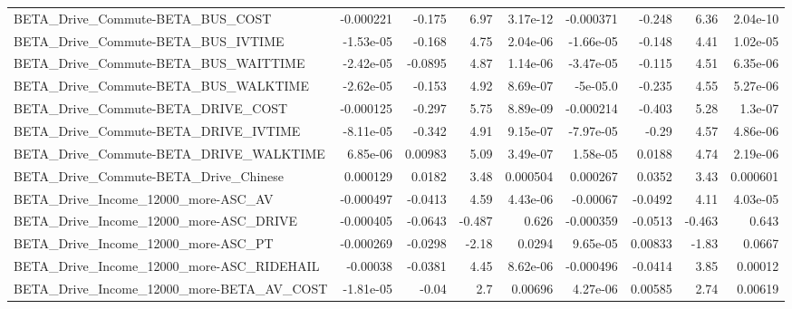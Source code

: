 \begin{tabular}{lrrrrrrrr}
BETA\_Drive\_Commute-BETA\_BUS\_COST                   &   -0.000221 &       -0.175 &     6.97 & 3.17e-12 &  -0.000371 &      -0.248 &         6.36 &      2.04e-10 \\
BETA\_Drive\_Commute-BETA\_BUS\_IVTIME                 &   -1.53e-05 &       -0.168 &     4.75 & 2.04e-06 &  -1.66e-05 &      -0.148 &         4.41 &      1.02e-05 \\
BETA\_Drive\_Commute-BETA\_BUS\_WAITTIME               &   -2.42e-05 &      -0.0895 &     4.87 & 1.14e-06 &  -3.47e-05 &      -0.115 &         4.51 &      6.35e-06 \\
BETA\_Drive\_Commute-BETA\_BUS\_WALKTIME               &   -2.62e-05 &       -0.153 &     4.92 & 8.69e-07 &   -5e-05.0 &      -0.235 &         4.55 &      5.27e-06 \\
BETA\_Drive\_Commute-BETA\_DRIVE\_COST                 &   -0.000125 &       -0.297 &     5.75 & 8.89e-09 &  -0.000214 &      -0.403 &         5.28 &       1.3e-07 \\
BETA\_Drive\_Commute-BETA\_DRIVE\_IVTIME               &   -8.11e-05 &       -0.342 &     4.91 & 9.15e-07 &  -7.97e-05 &       -0.29 &         4.57 &      4.86e-06 \\
BETA\_Drive\_Commute-BETA\_DRIVE\_WALKTIME             &    6.85e-06 &      0.00983 &     5.09 & 3.49e-07 &   1.58e-05 &      0.0188 &         4.74 &      2.19e-06 \\
BETA\_Drive\_Commute-BETA\_Drive\_Chinese              &    0.000129 &       0.0182 &     3.48 & 0.000504 &   0.000267 &      0.0352 &         3.43 &      0.000601 \\
BETA\_Drive\_Income\_12000\_more-ASC\_AV                &   -0.000497 &      -0.0413 &     4.59 & 4.43e-06 &   -0.00067 &     -0.0492 &         4.11 &      4.03e-05 \\
BETA\_Drive\_Income\_12000\_more-ASC\_DRIVE             &   -0.000405 &      -0.0643 &   -0.487 &    0.626 &  -0.000359 &     -0.0513 &       -0.463 &         0.643 \\
BETA\_Drive\_Income\_12000\_more-ASC\_PT                &   -0.000269 &      -0.0298 &    -2.18 &   0.0294 &   9.65e-05 &     0.00833 &        -1.83 &        0.0667 \\
BETA\_Drive\_Income\_12000\_more-ASC\_RIDEHAIL          &    -0.00038 &      -0.0381 &     4.45 & 8.62e-06 &  -0.000496 &     -0.0414 &         3.85 &       0.00012 \\
BETA\_Drive\_Income\_12000\_more-BETA\_AV\_COST          &   -1.81e-05 &        -0.04 &      2.7 &  0.00696 &   4.27e-06 &     0.00585 &         2.74 &       0.00619 \\

\end{tabular}
